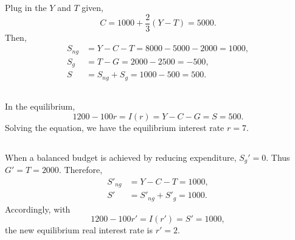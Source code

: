 \documentclass{article}
\begin{document}
\section{}
\subsection{}
Plug in the $Y$ and $T$ given,
\[
    C = 1000 + \frac{2}{3}(Y - T) = 5000.
\]
Then,
\begin{align*}
    S_{ng} &= Y - C - T
    = 8000 - 5000 - 2000 = 1000, \\
    S_g &= T - G
    = 2000 - 2500 = -500, \\
    S &= S_{ng} + S_g = 1000 - 500 = 500.
\end{align*}

\subsection{}
In the equilibrium,
\[
    1200 - 100 r = I(r) = Y - C - G = S = 500.
\]
Solving the equation, we have the equilibrium interest rate $r = 7$.

\subsection{}
When a balanced budget is achieved by reducing expenditure, $S_g' = 0$. Thus $G' = T = 2000$. Therefore,
\begin{align*}
    S'_{ng} &= Y - C - T = 1000, \\
    S' &=  S'_{ng} + S'_g = 1000.
\end{align*}
Accordingly, with
\[
    1200 - 100 r' = I(r') = S' = 1000,
\]
the new equilibrium real interest rate is $r' = 2$.
\end{document}
